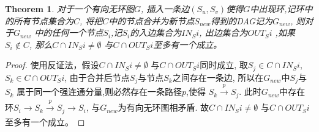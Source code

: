 \documentclass{article}
\newtheorem{theorem}{Theorem}
\begin{document}
\begin{theorem}  
    对于一个有向无环图$G$, 插入一条边$(S_u,S_v)$使得$G$中出现环,记环中的所有节点集合为$C$, 将把$C$中的节点合并为新节点$S_{new}$得到的DAG记为$G_{new}$, 则对于$G_{new}$
    中的任何一个节点$S_i$,记$S_i$的入边集合为$IN_Si$, 出边集合为$OUT_Si$ ,如果$S_i \notin C$, 那么$C \cap IN_Si \neq \emptyset$ 与$C \cap OUT_Si$至多有一个成立。 
\end{theorem}

\begin{proof} 
    使用反证法，假设$C \cap IN_Si \neq \emptyset$ 与$C \cap OUT_Si$同时成立, 取$S_j \in C \cap IN_Si$, $S_k \in C \cap OUT_Si$, 由于合并后节点$S_j$与节点$S_k$之间存在一条边, 所以在$G_{new}$中$S_j$与$S_k$
    属于同一个强连通分量,则必然存在一条路径$p$,使得 $ S_k \xrightarrow[]{p} S_j $. 此时$G_{new}$中存在环$S_i \xrightarrow[]{} S_k \xrightarrow[]{p} S_j \xrightarrow[]{} S_i$, 与$G_{new}$为有向无环图相矛盾.
    故$C \cap IN_Si \neq \emptyset$ 与$C \cap OUT_Si$至多有一个成立。
\end{proof}
\end{document}
